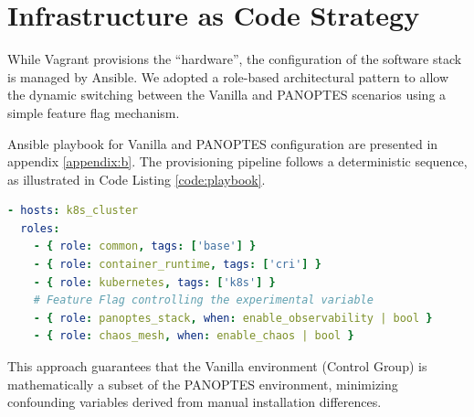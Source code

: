 \section{Infrastructure as Code Strategy}
\label{sec:iac-strategy}

While Vagrant provisions the ``hardware'', the configuration of the software stack is managed by Ansible. We adopted a role-based architectural pattern to allow the dynamic switching between the Vanilla and PANOPTES scenarios using a simple feature flag mechanism.

Ansible playbook for Vanilla and PANOPTES configuration are presented in appendix \ref{appendix:b}. The provisioning pipeline follows a deterministic sequence, as illustrated in Code Listing \ref{code:playbook}.

\begin{lstlisting}[language=yaml, caption={Main Playbook Structure}, label={code:playbook}]
- hosts: k8s_cluster
  roles:
    - { role: common, tags: ['base'] }
    - { role: container_runtime, tags: ['cri'] }
    - { role: kubernetes, tags: ['k8s'] }
    # Feature Flag controlling the experimental variable
    - { role: panoptes_stack, when: enable_observability | bool }
    - { role: chaos_mesh, when: enable_chaos | bool }
\end{lstlisting}

This approach guarantees that the Vanilla environment (Control Group) is mathematically a subset of the PANOPTES environment, minimizing confounding variables derived from manual installation differences.